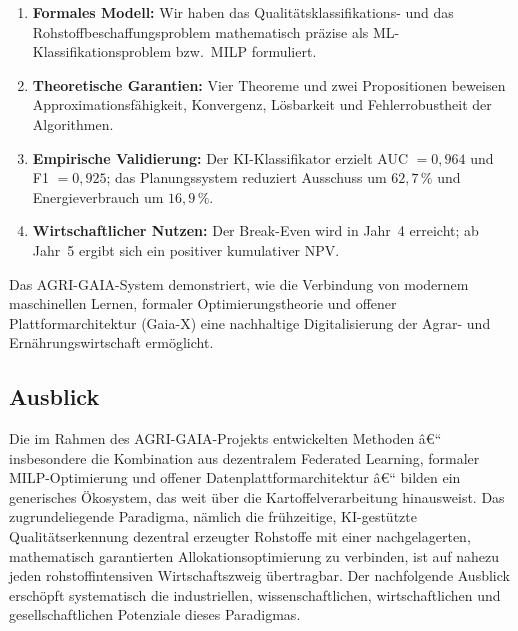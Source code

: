 ﻿\documentclass[12pt,a4paper]{article}
\theoremstyle{plain}
\theoremstyle{definition}
\begin{document}
	\begin{enumerate}
		\item \textbf{Formales Modell:} Wir haben das Qualitätsklassifikations-
		und das Rohstoffbeschaffungsproblem mathematisch präzise als
		ML-Klassifikationsproblem bzw.\ MILP formuliert.
		\item \textbf{Theoretische Garantien:} Vier Theoreme und zwei Propositionen
		beweisen Approximationsfähigkeit, Konvergenz, Lösbarkeit und
		Fehlerrobustheit der Algorithmen.
		\item \textbf{Empirische Validierung:} Der KI-Klassifikator erzielt
		AUC $= 0{,}964$ und F1 $= 0{,}925$; das Planungssystem reduziert
		Ausschuss um $62{,}7\,\%$ und Energieverbrauch um $16{,}9\,\%$.
		\item \textbf{Wirtschaftlicher Nutzen:} Der Break-Even wird in Jahr~4
		erreicht; ab Jahr~5 ergibt sich ein positiver kumulativer NPV.
	\end{enumerate}
	
	Das AGRI-GAIA-System demonstriert, wie die Verbindung von modernem
	maschinellen Lernen, formaler Optimierungstheorie und offener
	Plattformarchitektur (Gaia-X) eine nachhaltige Digitalisierung der
	Agrar- und Ernährungswirtschaft ermöglicht.

	\subsection{Ausblick}

	Die im Rahmen des AGRI-GAIA-Projekts entwickelten Methoden â€“ insbesondere
	die Kombination aus dezentralem Federated Learning, formaler
	MILP-Optimierung und offener Datenplattformarchitektur â€“ bilden ein
	generisches Ökosystem, das weit über die Kartoffelverarbeitung hinausweist.
	Das zugrundeliegende Paradigma, nämlich die frühzeitige, KI-gestützte
	Qualitätserkennung dezentral erzeugter Rohstoffe mit einer nachgelagerten,
	mathematisch garantierten Allokationsoptimierung zu verbinden, ist auf
	nahezu jeden rohstoffintensiven Wirtschaftszweig übertragbar. Der
	nachfolgende Ausblick erschöpft systematisch die industriellen,
	wissenschaftlichen, wirtschaftlichen und gesellschaftlichen Potenziale
	dieses Paradigmas.
\end{document}
